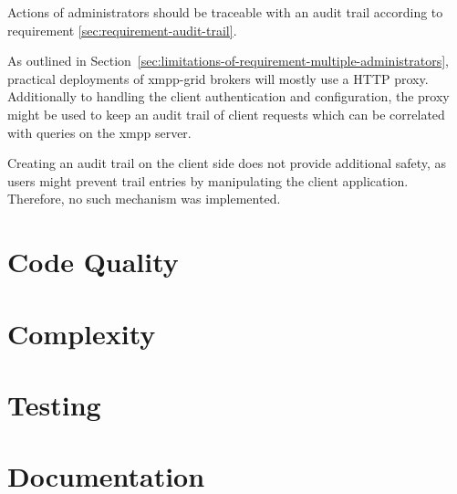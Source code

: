 Actions of administrators should be traceable with an audit trail according to requirement \ref{sec:requirement-audit-trail}.

As outlined in Section~\ref{sec:limitations-of-requirement-multiple-administrators}, practical deployments of \gls{xmpp-grid} \glspl{broker} will mostly use a HTTP proxy.
Additionally to handling the client authentication and configuration,
the proxy might be used to keep an audit trail of client requests which can be correlated with queries on the \gls{xmpp} server.

Creating an audit trail on the client side does not provide additional safety, as users might prevent trail entries by manipulating the client application. Therefore, no such mechanism was implemented.



\section{Code Quality}


\section{Complexity}
\section{Testing}


\section{Documentation}
